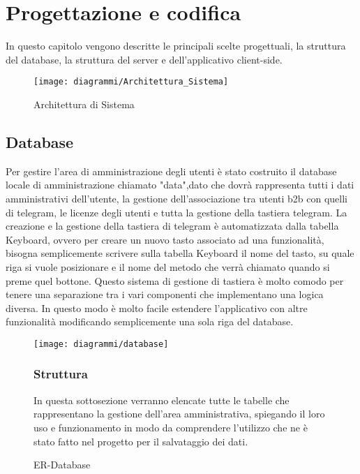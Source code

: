 

\clearpage
\label{cap:progettazione-codifica}



\chapter{Progettazione e codifica}




In questo capitolo vengono descritte le principali scelte progettuali, la struttura del database, la struttura del server e dell'applicativo client-side.


\begin{figure}[h]
   \begin{center}
     \texttt{[image: diagrammi/Architettura\_Sistema]} 
    \caption{Architettura di Sistema }
    \end{center}
\end{figure}
\clearpage

\section{Database}
\label{sec:database}

Per gestire l'area di amministrazione degli utenti è stato costruito il database locale di amministrazione chiamato "data",dato che dovrà rappresenta tutti i dati amministrativi dell'utente, la gestione dell'associazione tra utenti b2b con quelli di telegram, le licenze degli utenti e tutta la gestione della tastiera telegram. La creazione e la  gestione della tastiera di telegram è automatizzata dalla tabella Keyboard, ovvero per creare un nuovo tasto associato ad una funzionalità, bisogna semplicemente scrivere sulla tabella Keyboard il nome del tasto, su quale riga si vuole posizionare e il nome del metodo che verrà chiamato quando si preme quel bottone. Questo sistema di gestione di tastiera è molto comodo per tenere una separazione tra i vari componenti che implementano una logica diversa. In questo modo è molto facile estendere l'applicativo con altre funzionalità modificando semplicemente una sola riga del database. 



\begin{figure}[h!]
   \begin{center}
     \texttt{[image: diagrammi/database]} 
    \caption{ER-Database }
    \end{center}

\subsection{Struttura}
In questa sottosezione verranno elencate tutte le tabelle che rappresentano la gestione dell'area amministrativa, spiegando il loro uso e funzionamento in modo da comprendere l'utilizzo che ne è stato fatto nel progetto per il salvataggio dei dati. \\
\end{figure}


